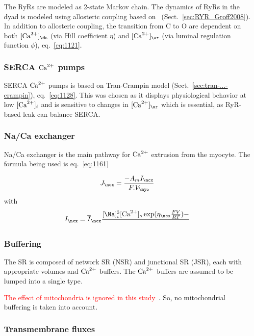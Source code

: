 The RyRs are modeled as 2-state Markov chain. The dynamics of RyRs in
the dyad is modeled using allosteric coupling based
on~\citep{groff2008} (Sect.~\ref{sec:RYR_Groff2008}). In
addition to allosteric coupling, the transition from C to O are
dependent on both $[\Ca]_\ds$ (via Hill coefficient $\eta$) and
$[\Ca]_\sr$ (via luminal regulation function $\phi$),
eq.~\eqref{eq:1121}.

\subsubsection{SERCA ${\text{Ca}^{2+}}$ pumps}

SERCA ${\text{Ca}^{2+}}$ pumps is based on Tran-Crampin model
(Sect.~\ref{sec:tran-...-crampin}), eq.~\eqref{eq:1128}. This was
chosen as it displays physiological behavior at low $[{\text{Ca}^{2+}}]_i$ and is
sensitive to changes in $[\Ca]_\sr$ which is essential, as RyR-based
leak can balance SERCA.

\subsubsection{Na/Ca exchanger}
\label{sec:naca-exchanger}

Na/Ca exchanger is the main pathway for ${\text{Ca}^{2+}}$ extrusion from the
myocyte. The formula being used is eq.~\eqref{eq:1161}

\begin{equation}
  \label{eq:1161}
  J_\ncx = \frac{-A_mI_\ncx}{F.V_\myo}
\end{equation}
with
\begin{equation}
  \label{eq:1146}
  I_\ncx=\overline{I}_\ncx\frac{[\Na]_i^3[\Ca]_o\exp(\eta_\ncx\frac{FV}{RT})-}{}
\end{equation}

\subsubsection{Buffering}
\label{sec:buffering-2}

The SR is composed of network SR (NSR) and junctional SR (JSR), each
with appropriate volumes and ${\text{Ca}^{2+}}$ buffers. The ${\text{Ca}^{2+}}$ buffers are
assumed to be lumped into a single type. 

\textcolor{red}{The effect of mitochondria is ignored in this
  study}~\citep{andrienko2009}. So, no mitochondrial buffering is
taken into account. 


\subsubsection{Transmembrane fluxes}
\label{sec:transmembrane-fluxes}

